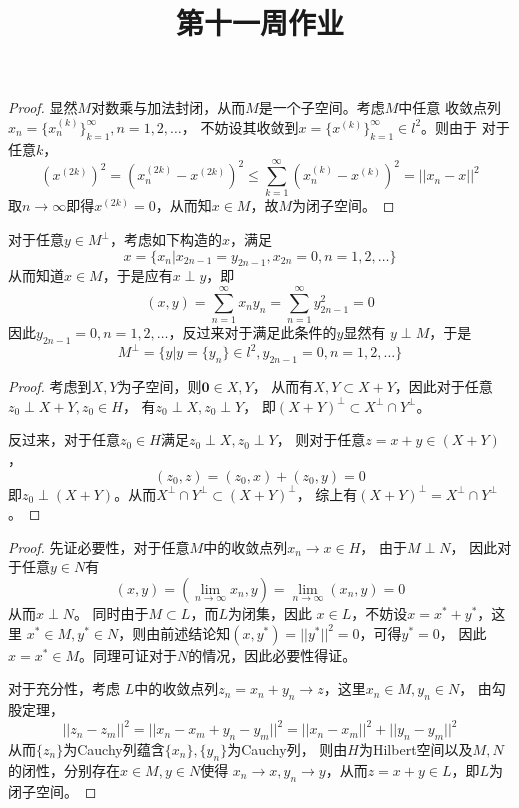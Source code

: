 \documentclass[cn]{homework}
\title{第十一周作业}
\begin{document}
    \maketitle

    \problem
    \begin{proof}
        显然$M$对数乘与加法封闭，从而$M$是一个子空间。考虑$M$中任意
        收敛点列$x_n=\{x_n^{(k)}\}_{k=1}^\infty,n=1,2,\ldots$，
        不妨设其收敛到$x=\{x^{(k)}\}_{k=1}^\infty\in l^2$。则由于
        对于任意$k$，
        \[\left(x^{(2k)}\right)^2=\left(x_n^{(2k)}-x^{(2k)}\right)^2
        \leq\sum_{k=1}^\infty \left(x_n^{(k)}-x^{(k)}\right)^2
        =||x_n-x||^2\]
        取$n\to\infty$即得$x^{(2k)}=0$，从而知$x\in M$，故$M$为闭子空间。
    \end{proof}

    对于任意$y\in M^\perp$，考虑如下构造的$x$，满足
    \[x=\{x_n|x_{2n-1}=y_{2n-1},x_{2n}=0,n=1,2,\ldots\}\]
    从而知道$x\in M$，于是应有$x\perp y$，即
    \[(x,y)=\sum_{n=1}^\infty x_ny_n=\sum_{n=1}^\infty y_{2n-1}^2=0\]
    因此$y_{2n-1}=0,n=1,2,\ldots$，反过来对于满足此条件的$y$显然有
    $y\perp M$，于是
    \[M^\perp=\{y|y=\{y_n\}\in l^2,y_{2n-1}=0,n=1,2,\ldots\}\]

    \problem
    \begin{proof}
        考虑到$X,Y$为子空间，则$\boldsymbol 0\in X,Y$，
        从而有$X,Y\subset X+Y$，因此对于任意$z_0\perp X+Y,z_0\in H$，
        有$z_0\perp X,z_0\perp Y$，
        即$(X+Y)^\perp\subset X^\perp\cap Y^\perp$。

        反过来，对于任意$z_0\in H$满足$z_0\perp X,z_0\perp Y$，
        则对于任意$z=x+y\in (X+Y)$，
        \[(z_0,z)=(z_0,x)+(z_0,y)=0\]
        即$z_0\perp (X+Y)$。从而$X^\perp\cap Y^\perp\subset (X+Y)^\perp$，
        综上有$(X+Y)^\perp=X^\perp\cap Y^\perp$。
    \end{proof}

    \problem
    \begin{proof}
        先证必要性，对于任意$M$中的收敛点列$x_n\to x\in H$，
        由于$M\perp N$，
        因此对于任意$y\in N$有
        \[(x,y)=(\lim_{n\to\infty}x_n,y)=\lim_{n\to\infty}(x_n,y)=0\]
        从而$x\perp N$。
        同时由于$M\subset L$，而$L$为闭集，因此
        $x\in L$，不妨设$x=x^*+y^*$，这里 
        $x^*\in M,y^*\in N$，则由前述结论知$(x,y^*)=||y^*||^2=0$，可得$y^*=0$，
        因此$x=x^*\in M$。同理可证对于$N$的情况，因此必要性得证。

        对于充分性，考虑
        $L$中的收敛点列$z_n=x_n+y_n\to z$，这里$x_n\in M,y_n\in N$，
        由勾股定理，
        \[||z_n-z_m||^2=||x_n-x_m+y_n-y_m||^2=||x_n-x_m||^2+||y_n-y_m||^2\]
        从而$\{z_n\}$为Cauchy列蕴含$\{x_n\},\{y_n\}$为Cauchy列，
        则由$H$为Hilbert空间以及$M,N$的闭性，分别存在$x\in M,y\in N$使得
        $x_n\to x,y_n\to y$，从而$z=x+y\in L$，即$L$为闭子空间。
    \end{proof}
\end{document}
